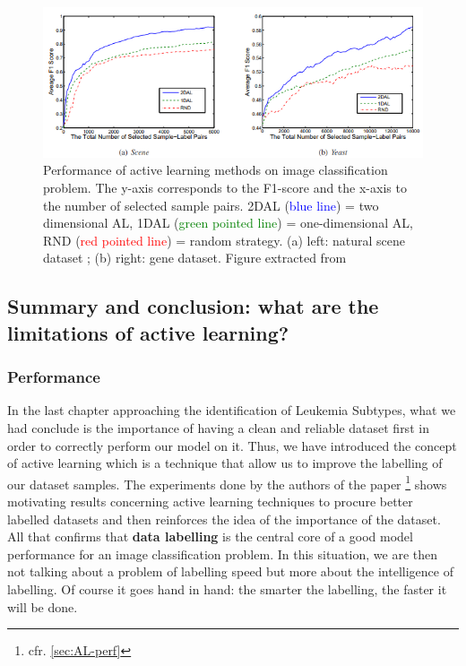 \documentclass[11pt, openany]{report}
\theoremstyle{plain}
\theoremstyle{definition}
\theoremstyle{remark}
\begin{document}
\begin{figure}[H]
  \centering
  \includegraphics[scale=0.9]{figures/results-AL.png}
  \caption{Performance of active learning methods on image classification problem. The y-axis corresponds to the F1-score and the x-axis to the number of selected sample pairs. 2DAL (\textcolor{blue}{blue line}) = two dimensional AL, 1DAL (\textcolor{green}{green pointed line}) = one-dimensional AL, RND (\textcolor{red}{red pointed line}) = random strategy. (a) left: natural scene dataset ; (b) right: gene dataset. Figure extracted from \cite{AL-perf}}
  \label{fig:results-AL}
\end{figure}

\newpage
\subsection{Summary and conclusion: what are the limitations of active learning?}

\subsubsection{Performance}
In the last chapter approaching the identification of Leukemia Subtypes, what we had conclude is the importance of having a clean and reliable dataset first in order to correctly perform our model on it. Thus, we have introduced the concept of active learning which is a technique that allow us to improve the labelling of our dataset samples. The experiments done by the authors of the paper \cite{AL-perf} \footnote{cfr. \autoref{sec:AL-perf}\label{note1}}  shows motivating results concerning active learning techniques to procure better labelled datasets and then reinforces the idea of the importance of the dataset. All that confirms that \textbf{data labelling} is the central core of a good model performance for an image classification problem. In this situation, we are then not talking about a problem of labelling speed but more about the intelligence of labelling. Of course it goes hand in hand: the smarter the labelling, the faster it will be done. 
\end{document}
